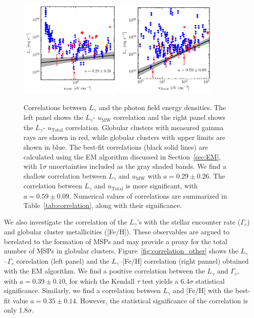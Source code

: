 \documentclass[doublespace,nopageskip]{VTthesis}
\begin{document}
\begin{figure}[htb]
    \centering
    \includegraphics[width=0.45\textwidth]{Figures/Globular/correlation/L_gamma_vs_isrf_urad.pdf}
    \includegraphics[width=0.45\textwidth]{Figures/Globular/correlation/L_gamma_vs_total_urad.pdf}
    \caption{\label{fig:correlation_urad} Correlations between $L_\gamma$ and the photon field energy densities. The left panel shows the $L_\gamma$- $u_\mathrm{MW}$ correlation and the right panel shows the $L_\gamma$- $u_\mathrm{Total}$ correlation. Globular clusters with measured gamma rays are shown in red, while globular clusters with upper limits are shown in blue. The best-fit correlations (black solid lines) are calculated using the EM algorithm discussed in Section~\ref{sec:EM}, with 1$\sigma$ uncertainties included as the gray shaded bands. We find a shallow correlation between $L_\gamma$ and $u_\mathrm{MW}$ with $a = 0.29 \pm 0.26$. The correlation between $L_\gamma$ and $u_\mathrm{Total}$ is more significant, with $a = 0.59 \pm 0.09$. Numerical values of correlations are summarized in Table~\ref{tab:correlation}, along with their significance.
    }
\end{figure}

We also investigate the correlation of the $L_\gamma$'s with the stellar encounter rate ($\Gamma_c$) and globular cluster metallicities ([Fe/H]). These observables are argued to berelated to the formation of MSPs and may provide a proxy for the total number of MSPs in globular clusters. Figure~\ref{fig:correlation_other} shows the $L_\gamma$--$\Gamma_c$ correlation (left panel) and the $L_\gamma$--[Fe/H] correlation (right pannel) obtained with the EM algorithm. We find a positive correlation between the $L_\gamma$ and $\Gamma_c$, with $a = 0.39 \pm 0.10$, for which the Kendall $\tau$ test yields a 6.4$\sigma$ statistical significance. Similarly, we find a correlation between $L_\gamma$ and [Fe/H] with the best-fit value $a = 0.35 \pm 0.14$. However, the statistical significance of the correlation is only 1.8$\sigma$. 
\end{document}
